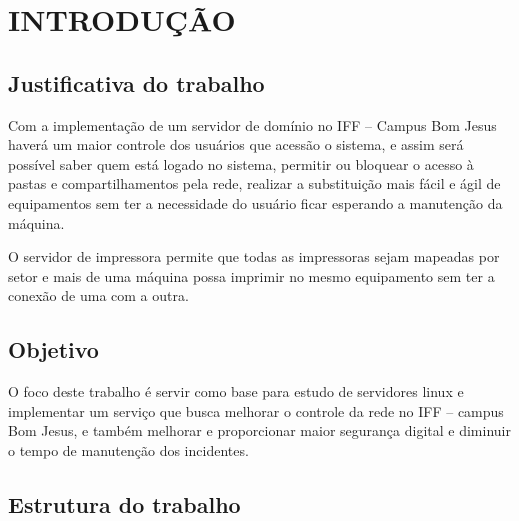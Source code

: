 \chapter{INTRODUÇÃO}

\section{Justificativa do trabalho}

Com a implementação de um servidor de domínio no IFF – Campus Bom Jesus haverá um maior controle dos usuários que acessão o sistema, e assim será possível saber quem está logado no sistema, permitir ou bloquear o acesso à pastas e compartilhamentos pela rede, realizar a substituição mais fácil e ágil de equipamentos sem ter a necessidade do usuário ficar esperando a manutenção da máquina.

O servidor de impressora permite que todas as impressoras sejam mapeadas por setor e mais de uma máquina possa imprimir no mesmo equipamento sem ter a conexão de uma com a outra.

\section{Objetivo}

O foco deste trabalho é servir como base para estudo de servidores linux e implementar um serviço que busca melhorar o controle da rede no IFF – campus Bom Jesus, e também melhorar e proporcionar maior segurança digital e diminuir o tempo de manutenção dos incidentes.

\section{Estrutura do trabalho}

